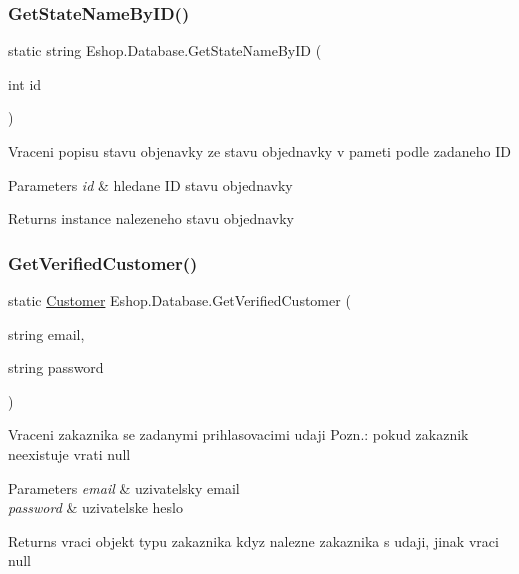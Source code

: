 \subsubsection{\texorpdfstring{GetStateNameByID()}{GetStateNameByID()}}
{\footnotesize\ttfamily static string Eshop.\+Database.\+Get\+State\+Name\+By\+ID (\begin{DoxyParamCaption}\item[{int}]{id }\end{DoxyParamCaption})\hspace{0.3cm}{\ttfamily [static]}}



Vraceni popisu stavu objenavky ze stavu objednavky v pameti podle zadaneho ID 


\begin{DoxyParams}{Parameters}
{\em id} & hledane ID stavu objednavky\\
\hline
\end{DoxyParams}
\begin{DoxyReturn}{Returns}
instance nalezeneho stavu objednavky
\end{DoxyReturn}
\mbox{\label{class_eshop_1_1_database_a27295cdd902acbf23a5ab9647725f4b8}} 
\subsubsection{\texorpdfstring{GetVerifiedCustomer()}{GetVerifiedCustomer()}}
{\footnotesize\ttfamily static \mbox{\hyperlink{class_eshop_1_1_customer}{Customer}} Eshop.\+Database.\+Get\+Verified\+Customer (\begin{DoxyParamCaption}\item[{string}]{email,  }\item[{string}]{password }\end{DoxyParamCaption})\hspace{0.3cm}{\ttfamily [static]}}



Vraceni zakaznika se zadanymi prihlasovacimi udaji Pozn.\+: pokud zakaznik neexistuje vrati null 


\begin{DoxyParams}{Parameters}
{\em email} & uzivatelsky email\\
\hline
{\em password} & uzivatelske heslo\\
\hline
\end{DoxyParams}
\begin{DoxyReturn}{Returns}
vraci objekt typu zakaznika kdyz nalezne zakaznika s udaji, jinak vraci null
\end{DoxyReturn}
\mbox{\label{class_eshop_1_1_database_abbe61af76e675e7dcc8c3e5bb4654b5a}} 
